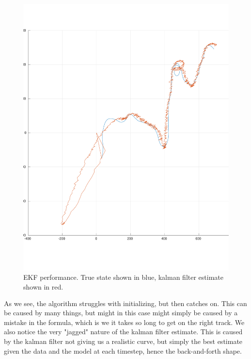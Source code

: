 \documentclass[]{article}
\begin{document}
\begin{figure}[H]
\centering
\includegraphics[width=\columnwidth]{ekf.pdf}
\caption{EKF performance. True state shown in blue, kalman filter estimate shown in red.}
\label{fig:ekf}
\end{figure}
As we see, the algorithm struggles with initializing, but then catches on. This can be caused by many things, but might in this case might simply be caused by a mistake in the formula, which is we it takes so long to get on the right track. We also notice the very "jagged" nature of the kalman filter estimate. This is caused by the kalman filter not giving us a realistic curve, but simply the best estimate given the data and the model at each timestep, hence the back-and-forth shape.
\end{document}
